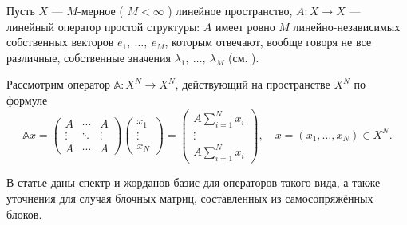 Пусть \( X \) --- \( M \)-мерное ( \( M < \infty \) ) линейное пространство,
\( A: X\to X \) --- линейный оператор простой структуры:
\( A \) имеет ровно \( M \) линейно-независимых собственных векторов \( e_1,~\ldots,~e_M \),
которым отвечают, вообще говоря не все различные, собственные значения
\( \lambda_1,~\ldots,~\lambda_M \) (см. \cite{baskakov-algebra}).

Рассмотрим оператор
\( \mathbb{A}: X^N\to X^N \), действующий на пространстве \( X^N \) по формуле
\[ \mathbb{A}x =
    \begin{pmatrix}
        A & \cdots & A \\
        \vdots & \ddots & \vdots \\
        A & \cdots & A
    \end{pmatrix}
    \begin{pmatrix}
        x_1 \\
        \vdots \\
        x_N
    \end{pmatrix}
    = \begin{pmatrix}
        A \sum_{i=1}^N x_i \\
        \vdots \\
        A \sum_{i=1}^N x_i
    \end{pmatrix},
    \quad x=(x_1,\ldots,x_N) \in X^N. \]

В статье даны спектр и жорданов базис для операторов такого вида,
а также уточнения для случая блочных матриц, составленных из самосопряжённых блоков.
